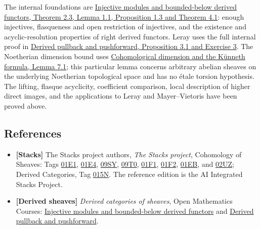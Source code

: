 \documentclass[11pt]{article}
\providecommand{\tightlist}{\setlength{\itemsep}{0pt}\setlength{\parskip}{0pt}}
\begin{document}
The internal foundations are
\href{../derived-categories-and-sheaf-operations/injective-modules-and-bounded-below-derived-functors.html}{Injective
modules and bounded-below derived functors, Theorem 2.3, Lemma 1.1,
Proposition 1.3 and Theorem 4.1}: enough injectives, flasqueness and
open restriction of injectives, and the existence and acyclic-resolution
properties of right derived functors. Leray uses the full internal proof
in
\href{../derived-categories-and-sheaf-operations/derived-pullback-and-pushforward.html}{Derived
pullback and pushforward, Proposition 3.1 and Exercise 3}. The
Noetherian dimension bound uses
\href{../ag-etale-cohomology/cohomological-dimension-and-the-kunneth-formula.html\#7-the-bound-for-all-finite-type-schemes}{Cohomological
dimension and the Künneth formula, Lemma 7.1}; this particular lemma
concerns arbitrary abelian sheaves on the underlying Noetherian
topological space and has no étale torsion hypothesis. The lifting,
flasque acyclicity, coefficient comparison, local description of higher
direct images, and the applications to Leray and Mayer--Vietoris have
been proved above.

\subsection{References}\label{references}

\begin{itemize}
\tightlist
\item
  \textbf{{[}Stacks{]}} The Stacks project authors, \emph{The Stacks
  project}, Cohomology of Sheaves: Tags
  \href{https://kokunoyumeto.github.io/stacks-zh-hans-cn/en/cohomology.html\#cohomology-lemma-cohomology-of-open}{01E1},
  \href{https://kokunoyumeto.github.io/stacks-zh-hans-cn/en/cohomology.html\#cohomology-lemma-describe-higher-direct-images}{01E4},
  \href{https://kokunoyumeto.github.io/stacks-zh-hans-cn/en/cohomology.html\#cohomology-lemma-flasque-acyclic}{09SY},
  \href{https://kokunoyumeto.github.io/stacks-zh-hans-cn/en/cohomology.html\#cohomology-lemma-flasque-acyclic-pushforward}{09T0},
  \href{https://kokunoyumeto.github.io/stacks-zh-hans-cn/en/cohomology.html\#cohomology-lemma-modules-abelian}{01F1},
  \href{https://kokunoyumeto.github.io/stacks-zh-hans-cn/en/cohomology.html\#cohomology-lemma-Leray}{01F2},
  \href{https://kokunoyumeto.github.io/stacks-zh-hans-cn/en/cohomology.html\#cohomology-lemma-mayer-vietoris}{01EB},
  and
  \href{https://kokunoyumeto.github.io/stacks-zh-hans-cn/en/cohomology.html\#cohomology-proposition-vanishing-Noetherian}{02UZ};
  Derived Categories, Tag
  \href{https://kokunoyumeto.github.io/stacks-zh-hans-cn/en/derived.html\#derived-lemma-grothendieck-spectral-sequence}{015N}.
  The reference edition is the AI Integrated Stacks Project.
\item
  \textbf{{[}Derived sheaves{]}} \emph{Derived categories of sheaves},
  Open Mathematics Courses:
  \href{../derived-categories-and-sheaf-operations/injective-modules-and-bounded-below-derived-functors.html}{Injective
  modules and bounded-below derived functors} and
  \href{../derived-categories-and-sheaf-operations/derived-pullback-and-pushforward.html}{Derived
  pullback and pushforward}.
\end{itemize}
\end{document}
